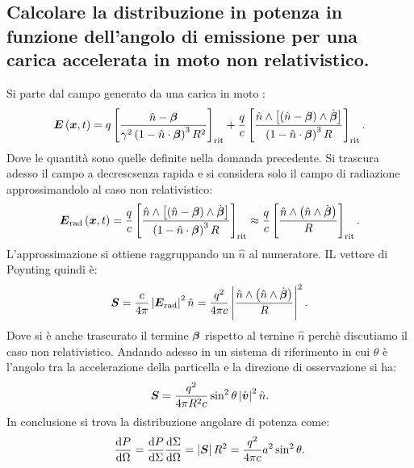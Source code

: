 \subsection[]{Calcolare la distribuzione in potenza in funzione dell’angolo di emissione per una carica accelerata in moto non relativistico.}
\label{sec:3.b.3}
Si parte dal campo generato da una carica in moto :
\[
	\boldsymbol{E}\left( \boldsymbol{x},t \right) = q \left[ \frac{\hat{n}-\boldsymbol{\beta}}{\gamma^2\left( 1-\hat{n}\cdot \boldsymbol{\beta} \right)^3 R^2 } \right]_{\text{rit}}+
	\frac{q}{c} \left[ \frac{\hat{n}\wedge \left[ \left( \hat{n}-\boldsymbol{\beta} \right) \wedge \dot{\boldsymbol{\beta}}  \right] }
	{\left( 1-\hat{n}\cdot \boldsymbol{\beta} \right)^3 R}  \right]_{\text{rit}} 
.\] \label{eq:L-W} 
Dove le quantità sono quelle definite nella domanda precedente. Si trascura adesso il campo a decrescsenza rapida e si considera solo il campo di radiazione approssimandolo al caso non relativistico:
\[
	\boldsymbol{E}_{\text{rad}}\left( \boldsymbol{x},t \right)= \frac{q}{c} \left[ \frac{\hat{n}\wedge \left[ \left( \hat{n}-\boldsymbol{\beta} \right) \wedge \dot{\boldsymbol{\beta}}  \right] }
	{\left( 1-\hat{n}\cdot \boldsymbol{\beta} \right)^3 R}  \right]_{\text{rit}}  \approx \frac{q}{c} \left[ \frac{\hat{n}\wedge \left( \hat{n}\wedge \dot{\boldsymbol{\beta}}\right)}{R} \right]_{\text{rit}} 
.\] 
L'approssimazione si ottiene raggruppando un $\hat{n}$ al numeratore. IL vettore di Poynting quindi è:
\[
	\boldsymbol{S}= \frac{c}{4 \pi} \left| \boldsymbol{E}_{\text{rad}} \right| ^2 \hat{n}=\frac{q^2}{4\pi c} 
	\left| \frac{\hat{n}\wedge \left( \hat{n}\wedge  \dot{\boldsymbol{\beta}}\right)}{R} \right|^2
.\] 
Dove si è anche trascurato il termine $\boldsymbol{\beta}$ rispetto al ternine $\hat{n}$ perchè discutiamo il caso  non relativistico. Andando adesso in un sistema di riferimento in cui $\theta$ è l'angolo tra la accelerazione della particella e la direzione di osservazione si ha:
\[
	\boldsymbol{S}= \frac{q^2}{4\pi R^2 c}\sin^2\theta \left| \dot{\boldsymbol{v}} \right| ^2 \hat{n}
.\] 
In conclusione si trova la distribuzione angolare di potenza come:
\[
	\frac{\mbox{d} P}{\mbox{d} \Omega} = \frac{\mbox{d} P}{\mbox{d} \Sigma } \frac{\mbox{d} \Sigma}{\mbox{d} \Omega}=
	\left| \boldsymbol{S} \right| R^2 = \frac{q^2}{4\pi c} a^2 \sin^2\theta
.\] 

